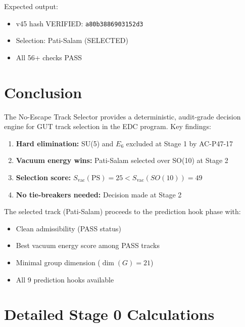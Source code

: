 \documentclass[11pt,a4paper]{article}
\begin{document}
Expected output:
\begin{itemize}
\item v45 hash VERIFIED: \texttt{a80b3886903152d3}
\item Selection: Pati-Salam (SELECTED)
\item All 56+ checks PASS
\end{itemize}

\section{Conclusion}
\label{sec:conclusion}

The No-Escape Track Selector provides a deterministic, audit-grade decision engine
for GUT track selection in the EDC program. Key findings:

\begin{enumerate}
\item \textbf{Hard elimination:} SU(5) and $E_6$ excluded at Stage 1 by AC-P47-17
\item \textbf{Vacuum energy wins:} Pati-Salam selected over SO(10) at Stage 2
\item \textbf{Selection score:} $S_{\text{vac}}(\text{PS}) = 25 < S_{\text{vac}}(SO(10)) = 49$
\item \textbf{No tie-breakers needed:} Decision made at Stage 2
\end{enumerate}

The selected track (Pati-Salam) proceeds to the prediction hook phase with:
\begin{itemize}
\item Clean admissibility (PASS status)
\item Best vacuum energy score among PASS tracks
\item Minimal group dimension ($\dim(G) = 21$)
\item All 9 prediction hooks available
\end{itemize}

\appendix

\section{Detailed Stage 0 Calculations}
\label{app:stage0-detail}
\end{document}
